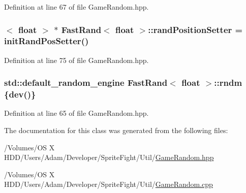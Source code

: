 Definition at line 67 of file Game\-Random.\-hpp.

\hypertarget{class_fast_rand_3_01float_01_4_a21d8919b2edde92a6f5f52d4941b47de}{
\subsubsection[{rand\-Position\-Setter}]{$<$ float $>$ $\ast$ {\bf Fast\-Rand}$<$ float $>$\-::rand\-Position\-Setter = {\bf init\-Rand\-Pos\-Setter}()\hspace{0.3cm}{\ttfamily [static]}}}\label{class_fast_rand_3_01float_01_4_a21d8919b2edde92a6f5f52d4941b47de}


Definition at line 75 of file Game\-Random.\-hpp.

\hypertarget{class_fast_rand_3_01float_01_4_a4e627b7fa54bb1f71462ff0ba3a0a95c}{
\subsubsection[{rndm}]{\setlength{\rightskip}{0pt plus 5cm}std\-::default\-\_\-random\-\_\-engine {\bf Fast\-Rand}$<$ float $>$\-::rndm \{{\bf dev}()\}\hspace{0.3cm}{\ttfamily [protected]}}}\label{class_fast_rand_3_01float_01_4_a4e627b7fa54bb1f71462ff0ba3a0a95c}


Definition at line 65 of file Game\-Random.\-hpp.



The documentation for this class was generated from the following files\-:\begin{DoxyCompactItemize}
\item 
/\-Volumes/\-O\-S X H\-D\-D/\-Users/\-Adam/\-Developer/\-Sprite\-Fight/\-Util/\hyperlink{_game_random_8hpp}{Game\-Random.\-hpp}\item 
/\-Volumes/\-O\-S X H\-D\-D/\-Users/\-Adam/\-Developer/\-Sprite\-Fight/\-Util/\hyperlink{_game_random_8cpp}{Game\-Random.\-cpp}\end{DoxyCompactItemize}
